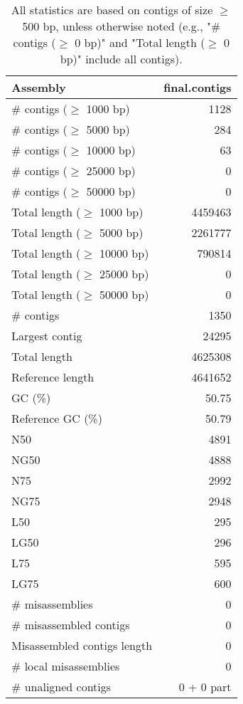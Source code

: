 \documentclass[12pt,a4paper]{article}
\begin{document}
\begin{table}[ht]
\begin{center}
\caption{All statistics are based on contigs of size $\geq$ 500 bp, unless otherwise noted (e.g., "\# contigs ($\geq$ 0 bp)" and "Total length ($\geq$ 0 bp)" include all contigs).}
\begin{tabular}{|l*{1}{|r}|}
\hline
Assembly & final.contigs \\ \hline
\# contigs ($\geq$ 1000 bp) & 1128 \\ \hline
\# contigs ($\geq$ 5000 bp) & 284 \\ \hline
\# contigs ($\geq$ 10000 bp) & 63 \\ \hline
\# contigs ($\geq$ 25000 bp) & 0 \\ \hline
\# contigs ($\geq$ 50000 bp) & 0 \\ \hline
Total length ($\geq$ 1000 bp) & 4459463 \\ \hline
Total length ($\geq$ 5000 bp) & 2261777 \\ \hline
Total length ($\geq$ 10000 bp) & 790814 \\ \hline
Total length ($\geq$ 25000 bp) & 0 \\ \hline
Total length ($\geq$ 50000 bp) & 0 \\ \hline
\# contigs & 1350 \\ \hline
Largest contig & 24295 \\ \hline
Total length & 4625308 \\ \hline
Reference length & 4641652 \\ \hline
GC (\%) & 50.75 \\ \hline
Reference GC (\%) & 50.79 \\ \hline
N50 & 4891 \\ \hline
NG50 & 4888 \\ \hline
N75 & 2992 \\ \hline
NG75 & 2948 \\ \hline
L50 & 295 \\ \hline
LG50 & 296 \\ \hline
L75 & 595 \\ \hline
LG75 & 600 \\ \hline
\# misassemblies & 0 \\ \hline
\# misassembled contigs & 0 \\ \hline
Misassembled contigs length & 0 \\ \hline
\# local misassemblies & 0 \\ \hline
\# unaligned contigs & 0 + 0 part \\ \hline

\end{tabular}
\end{center}
\end{table}
\end{document}
